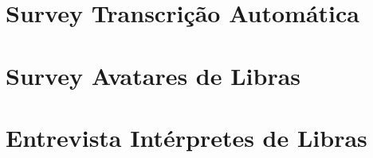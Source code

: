 \documentclass[doutorado, pre-defesa]{packages/icmc}
\begin{document}

\begin{apendicesenv}

\chapter{Survey Transcrição Automática}
\label{appendix:asr-survey}


\chapter{Survey Avatares de Libras}
\label{appendix:libras-survey}


\chapter{Entrevista Intérpretes de Libras}
\label{appendix:libras-interview}


\end{apendicesenv}




%     

\end{document}
